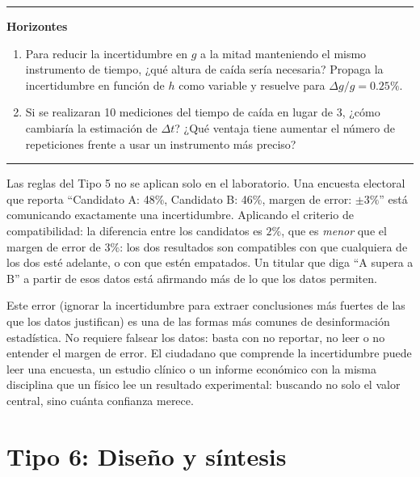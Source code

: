 \documentclass[11pt]{book}
\begin{document}
\begin{enumerate}
\begin{description}
\medskip
\noindent\rule{\linewidth}{0.4pt}
\noindent\textbf{Horizontes}
\medskip

\begin{enumerate}
    \item Para reducir la incertidumbre en $g$ a la mitad manteniendo el mismo instrumento de tiempo, ¿qué altura de caída sería necesaria? Propaga la incertidumbre en función de $h$ como variable y resuelve para $\Delta g / g = 0.25\%$.
    \item Si se realizaran 10 mediciones del tiempo de caída en lugar de 3, ¿cómo cambiaría la estimación de $\Delta t$? ¿Qué ventaja tiene aumentar el número de repeticiones frente a usar un instrumento más preciso?
\end{enumerate}

\end{description}
\end{enumerate}

\medskip
\noindent\rule{\linewidth}{0.4pt}


\medskip
Las reglas del Tipo 5 no se aplican solo en el laboratorio. Una encuesta electoral que reporta ``Candidato A: 48\%, Candidato B: 46\%, margen de error: $\pm 3\%$'' está comunicando exactamente una incertidumbre. Aplicando el criterio de compatibilidad: la diferencia entre los candidatos es $2\%$, que es {\it menor} que el margen de error de $3\%$: los dos resultados son compatibles con que cualquiera de los dos esté adelante, o con que estén empatados. Un titular que diga ``A supera a B'' a partir de esos datos está afirmando más de lo que los datos permiten.

Este error (ignorar la incertidumbre para extraer conclusiones más fuertes de las que los datos justifican) es una de las formas más comunes de desinformación estadística. No requiere falsear los datos: basta con no reportar, no leer o no entender el margen de error. El ciudadano que comprende la incertidumbre puede leer una encuesta, un estudio clínico o un informe económico con la misma disciplina que un físico lee un resultado experimental: buscando no solo el valor central, sino cuánta confianza merece.

\section{Tipo 6: Diseño y síntesis}
\end{document}
